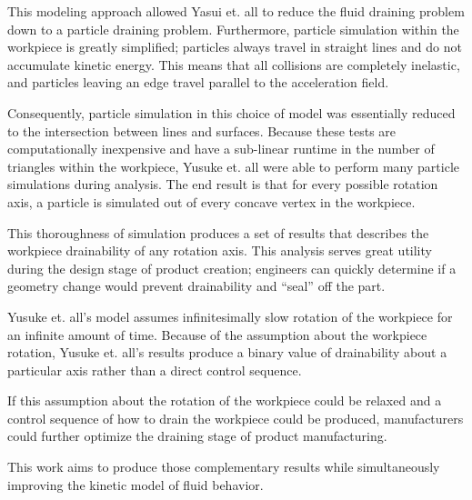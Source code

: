 This modeling approach allowed Yasui et. all to reduce the fluid draining problem down to a particle draining problem. Furthermore, particle simulation within the workpiece is greatly simplified; particles always travel in straight lines and do not accumulate kinetic energy. This means that all collisions are completely inelastic, and particles leaving an edge travel parallel to the acceleration field.

Consequently, particle simulation in this choice of model was essentially reduced to the intersection between lines and surfaces. Because these tests are computationally inexpensive and have a sub-linear runtime in the number of triangles within the workpiece, Yusuke et. all were able to perform many particle simulations during analysis. The end result is that for every possible rotation axis, a particle is simulated out of every concave vertex in the workpiece.

This thoroughness of simulation produces a set of results that describes the workpiece drainability of any rotation axis. This analysis serves great utility during the design stage of product creation; engineers can quickly determine if a geometry change would prevent drainability and ``seal'' off the part.

Yusuke et. all's model assumes infinitesimally slow rotation of the workpiece for an infinite amount of time. Because of the assumption about the workpiece rotation, Yusuke et. all's results produce a binary value of drainability about a particular axis rather than a direct control sequence.

If this assumption about the rotation of the workpiece could be relaxed and a  control sequence of how to drain the workpiece could be produced, manufacturers could further optimize the draining stage of product manufacturing.

This work aims to produce those complementary results while simultaneously improving the kinetic model of fluid behavior.




